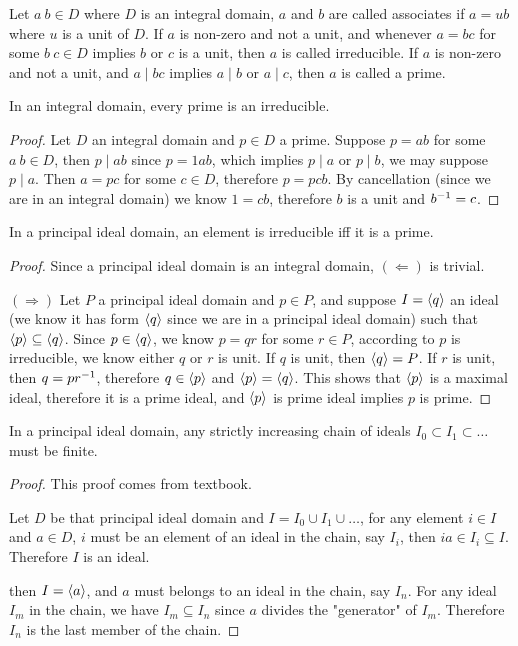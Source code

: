 \documentclass[../main.tex]{subfiles}
\begin{document}
\begin{definition}
  Let $a \ b \in D$ where $D$ is an integral domain,
  $a$ and $b$ are called associates if $a = ub$ where $u$ is a unit of $D$.
  If $a$ is non-zero and not a unit, and whenever $a = bc$ for some $b \ c \in D$
  implies $b$ or $c$ is a unit, then $a$ is called irreducible.
  If $a$ is non-zero and not a unit, and $a \mid bc$ implies $a \mid b$ or $a \mid c$,
  then $a$ is called a prime.
\end{definition}

\begin{theorem}
  \label{Theorem:18.1}
  In an integral domain, every prime is an irreducible.
\end{theorem}
\begin{proof}
  Let $D$ an integral domain and $p \in D$ a prime. Suppose $p = ab$ for some 
  $a \ b \in D$, then $p \mid ab$ since $p = 1 ab$, which implies $p \mid a$
  or $p \mid b$, we may suppose $p \mid a$.
  Then $a = pc$ for some $c \in D$, therefore $p = pcb$. By cancellation
  (since we are in an integral domain) we know $1 = cb$, therefore $b$ is a unit
  and $b^{-1} = c$.
\end{proof}

\begin{theorem}
  In a principal ideal domain, an element is irreducible iff it is a prime.
\end{theorem}
\begin{proof}
  Since a principal ideal domain is an integral domain, $(\Leftarrow)$ is trivial.

  $(\Rightarrow)$ Let $P$ a principal ideal domain and $p \in P$, 
  and suppose $I = \langle q \rangle$ an ideal
  (we know it has form $\langle q \rangle$ since we are in a principal ideal domain)
  such that $\langle p \rangle \subseteq \langle q \rangle$.
  Since $p \in \langle q \rangle$, we know $p = qr$ for some $r \in P$,
  according to $p$ is irreducible, we know either $q$ or $r$ is unit.
  If $q$ is unit, then $\langle q \rangle = P$.
  If $r$ is unit, then $q = pr^{-1}$, therefore $q \in \langle p \rangle$ and $\langle p \rangle = \langle q \rangle$.
  This shows that $\langle p \rangle$ is a maximal ideal, therefore it is a prime ideal,
  and $\langle p \rangle$ is prime ideal implies $p$ is prime.
\end{proof}

\begin{lemma}
  \label{Lemma:18.1}
  In a principal ideal domain, any strictly increasing chain of ideals
  $I_0 \subset I_1 \subset \dots$ must be finite.
\end{lemma}
\begin{proof}
  This proof comes from textbook.

  Let $D$ be that principal ideal domain and 
  $I = I_0 \cup I_1 \cup \dots$, 
  for any element $i \in I$ and $a \in D$, $i$ must be an element of an ideal
  in the chain, say $I_i$, then $ia \in I_i \subseteq I$.
  Therefore $I$ is an ideal.

  then $I = \langle a \rangle$, and $a$ must belongs
  to an ideal in the chain, say $I_n$. For any ideal $I_m$ in the chain,
  we have $I_m \subseteq I_n$ since $a$ divides the "generator" of $I_m$.
  Therefore $I_n$ is the last member of the chain.
\end{proof}
\end{document}

